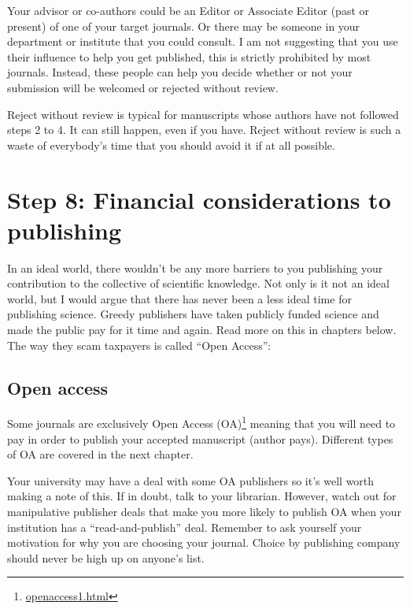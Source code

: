 \documentclass[
]{krantz}
\renewcommand{\href}[2]{#2\footnote{\url{#1}}}
\begin{document}
Your advisor or co-authors could be an Editor or Associate Editor (past or present) of one of your target journals. Or there may be someone in your department or institute that you could consult. I am not suggesting that you use their influence to help you get published, this is strictly prohibited by most journals. Instead, these people can help you decide whether or not your submission will be welcomed or rejected without review.

Reject without review is typical for manuscripts whose authors have not followed steps 2 to 4. It can still happen, even if you have. Reject without review is such a waste of everybody's time that you should avoid it if at all possible.

\hypertarget{step-8-financial-considerations-to-publishing}{%
\section{Step 8: Financial considerations to publishing}\label{step-8-financial-considerations-to-publishing}}

In an ideal world, there wouldn't be any more barriers to you publishing your contribution to the collective of scientific knowledge. Not only is it not an ideal world, but I would argue that there has never been a less ideal time for publishing science. Greedy publishers have taken publicly funded science and made the public pay for it time and again. Read more on this in chapters below. The way they scam taxpayers is called ``Open Access'':

\hypertarget{open-access}{%
\subsection{Open access}\label{open-access}}

Some journals are exclusively \href{openaccess1.html}{Open Access (OA)} meaning that you will need to pay in order to publish your accepted manuscript (author pays). Different types of OA are covered in the next chapter.

Your university may have a deal with some OA publishers so it's well worth making a note of this. If in doubt, talk to your librarian. However, watch out for manipulative publisher deals that make you more likely to publish OA when your institution has a ``read-and-publish'' deal. Remember to ask yourself your motivation for why you are choosing your journal. Choice by publishing company should never be high up on anyone's list.
\end{document}
